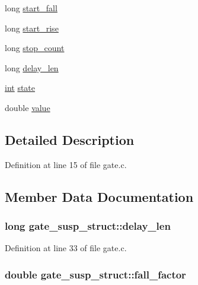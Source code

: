 \begin{DoxyCompactItemize}
\item 
long \hyperlink{structgate__susp__struct_a01a6f5ba88da656aba30d0845ec85939}{start\+\_\+fall}
\item 
long \hyperlink{structgate__susp__struct_a112887a66e5a1e7f37db4049eb327ee5}{start\+\_\+rise}
\item 
long \hyperlink{structgate__susp__struct_a6368a5161ac46233aafec90eb6a12b16}{stop\+\_\+count}
\item 
long \hyperlink{structgate__susp__struct_aa78b0323016fee89c30c54409e354011}{delay\+\_\+len}
\item 
\hyperlink{xmltok_8h_a5a0d4a5641ce434f1d23533f2b2e6653}{int} \hyperlink{structgate__susp__struct_a3a192c80c2595f49d5d66cb7fa0e9389}{state}
\item 
double \hyperlink{structgate__susp__struct_a2136210761133f7b553d4eabcdc671cb}{value}
\end{DoxyCompactItemize}


\subsection{Detailed Description}


Definition at line 15 of file gate.\+c.



\subsection{Member Data Documentation}
\subsubsection[{\texorpdfstring{delay\+\_\+len}{delay_len}}]{\setlength{\rightskip}{0pt plus 5cm}long gate\+\_\+susp\+\_\+struct\+::delay\+\_\+len}\hypertarget{structgate__susp__struct_aa78b0323016fee89c30c54409e354011}{}\label{structgate__susp__struct_aa78b0323016fee89c30c54409e354011}


Definition at line 33 of file gate.\+c.

\subsubsection[{\texorpdfstring{fall\+\_\+factor}{fall_factor}}]{\setlength{\rightskip}{0pt plus 5cm}double gate\+\_\+susp\+\_\+struct\+::fall\+\_\+factor}\hypertarget{structgate__susp__struct_a8aa9e42c9a866827d190740d6e5ca029}{}\label{structgate__susp__struct_a8aa9e42c9a866827d190740d6e5ca029}


